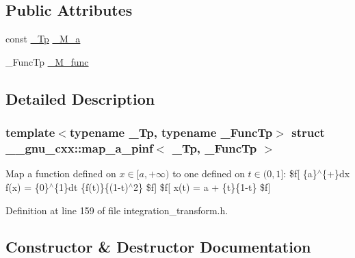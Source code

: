 \subsection*{Public Attributes}
\begin{DoxyCompactItemize}
\item 
const \hyperlink{namespace____gnu__cxx_a3b19a9c800ca194374ef9172290f7d79}{\+\_\+\+Tp} \hyperlink{struct____gnu__cxx_1_1map__a__pinf_a1de7ffe1b5ac3d528cb472ced4878f27}{\+\_\+\+M\+\_\+a}
\item 
\+\_\+\+Func\+Tp \hyperlink{struct____gnu__cxx_1_1map__a__pinf_a5e842585fa430caa329cb26a4976ee88}{\+\_\+\+M\+\_\+func}
\end{DoxyCompactItemize}


\subsection{Detailed Description}
\subsubsection*{template$<$typename \+\_\+\+Tp, typename \+\_\+\+Func\+Tp$>$\newline
struct \+\_\+\+\_\+gnu\+\_\+cxx\+::map\+\_\+a\+\_\+pinf$<$ \+\_\+\+Tp, \+\_\+\+Func\+Tp $>$}

Map a function defined on $ x \in [a, +\infty) $ to one defined on $ t \in (0, 1] $\+: \$f\mbox{[} \{a\}$^\wedge$\{+\}dx f(x) = \{0\}$^\wedge$\{1\}dt \{f(t)\}\{(1-\/t)$^\wedge$2\} \$f\mbox{]} \$f\mbox{[} x(t) = a + \{t\}\{1-\/t\} \$f\mbox{]} 

Definition at line 159 of file integration\+\_\+transform.\+h.



\subsection{Constructor \& Destructor Documentation}
\mbox{\label{struct____gnu__cxx_1_1map__a__pinf_acc55db8d0a0fbe0bc604444dfecb2efe}} 
